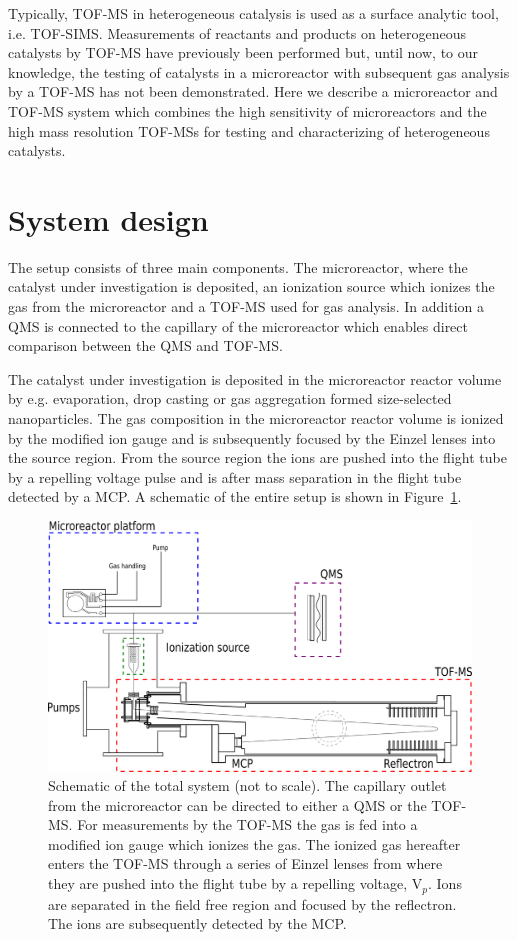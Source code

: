 \documentclass[aip,rsi]{revtex4-1}
\begin{document}
Typically, TOF-MS in heterogeneous catalysis is used as a surface analytic tool, i.e. TOF-SIMS\cite{Benninghoven1994,DeSmet1998,Grams2004,Johnson2010}. Measurements of reactants and products on heterogeneous catalysts by TOF-MS have previously been performed\cite{Levy1963,Okumura2007} but, until now, to our knowledge, the testing of catalysts in a microreactor with subsequent gas analysis by a TOF-MS has not been demonstrated. Here we describe a microreactor and TOF-MS system which combines the high sensitivity of microreactors and the high mass resolution TOF-MSs for testing and characterizing of heterogeneous catalysts.

\section{System design}
The setup consists of three main components. The microreactor, where the catalyst under investigation is deposited, an ionization source which ionizes the gas from the microreactor and a TOF-MS used for gas analysis. In addition a QMS is connected to the capillary of the microreactor which enables direct comparison between the QMS and TOF-MS.

The catalyst under investigation is deposited in the microreactor reactor volume by e.g. evaporation\cite{Henriksen2009}, drop casting\cite{Vesborg2010} or gas aggregation formed size-selected nanoparticles. The gas composition in the microreactor reactor volume is ionized by the modified ion gauge  and is subsequently focused by the Einzel lenses into the source region. From the source region the ions are pushed into the flight tube by a repelling voltage pulse and is after mass separation in the flight tube detected by a MCP. A schematic of the entire setup is shown in Figure~\ref{fig:TOF_microreactor}.
\begin{figure}
 \includegraphics[width=14cm]{TOF_microreactor.png}%
 \caption{Schematic of the total system (not to scale). The capillary outlet from the microreactor can be directed to either a QMS or the TOF-MS. For measurements by the TOF-MS the gas is fed into a modified ion gauge which ionizes the gas. The ionized gas hereafter enters the TOF-MS through a series of Einzel lenses from where they are pushed into the flight tube by a repelling voltage, V$_p$. Ions are separated in the field free region and focused by the reflectron. The ions are subsequently detected by the MCP.\label{fig:TOF_microreactor}}%
\end{figure}
\end{document}
